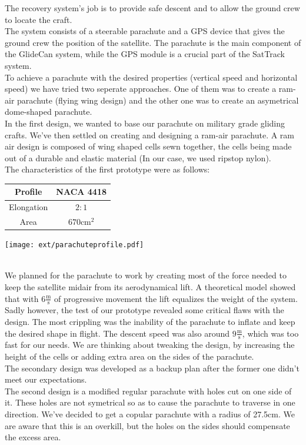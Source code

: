 \documentclass[class=report, crop=false]{standalone}
\begin{document}
The recovery system's job is to provide safe descent and to allow the ground crew to locate the craft. \\
The system consists of a steerable parachute and a GPS device that gives the ground crew the position of the satellite. 
The parachute is the main component of the GlideCan system, while the GPS module is a crucial part of the SatTrack system. \\

To achieve a parachute with the desired properties (vertical speed and horizontal speed) we have tried two seperate approaches. One of them was to create a ram-air parachute (flying wing design) and the other one was to create an asymetrical dome-shaped parachute. \\
In the first design, we wanted to base our parachute on military grade gliding crafts. We've then settled on creating and designing a ram-air parachute. A ram air design is composed of wing shaped cells sewn together, the cells being made out of a durable and elastic material (In our case, we used ripstop nylon). \\
The characteristics of the first prototype were as follows: \\
\begin{minipage}{.34\textwidth}
  \begin{tabular}{|c|c|}
    \hline
    Profile & NACA 4418 \\\hline
    Elongation & $2:1
    $ \\\hline
    Area & $670\text{cm}^2$ \\\hline
  \end{tabular}
\end{minipage}
\hfill
\begin{minipage}{.66\textwidth}
  \texttt{[image: ext/parachuteprofile.pdf]}
\end{minipage}
\\\newpage
\vfill
We planned for the parachute to work by creating most of the force needed to keep the satellite midair from its aerodynamical lift.
A theoretical model showed that with $6\frac{\text{m}}{\text{s}}$ of progressive movement the lift equalizes the weight of the system. \\
Sadly however, the test of our prototype revealed some critical flaws with the design.
The most crippling was the inability of the parachute to inflate and keep the desired shape in flight.
The descent speed was also around $9\frac{\text{m}}{\text{s}}$, which was too fast for our needs.
We are thinking about tweaking the design, by increasing the height of the cells or adding extra area on the sides of the parachute. \\
The secondary design was developed as a backup plan after the former one didn't meet our expectations. \\
The second design is a modified regular parachute with holes cut on one side of it.
These holes are not symetrical so as to cause the parachute to traverse in one direction.
We've decided to get a copular parachute with a radius of 27.5cm. We are aware that this is an overkill, but the holes on the sides should compensate the excess area. \\
\end{document}
